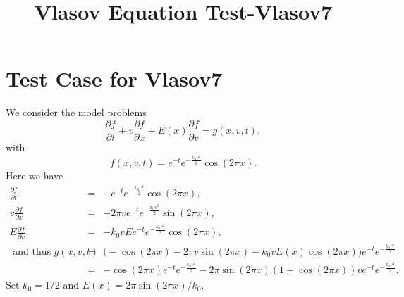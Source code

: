 \documentclass[a4paper,10pt]{article}
\title{Vlasov Equation Test-Vlasov7}
\author{}
\date{}
\numberwithin{equation}{section}
\begin{document}
\maketitle


\section{Test Case for Vlasov7}
We consider the model problems
\begin{equation}
\frac{\partial f}{\partial t}+v\frac{\partial f}{\partial x}+E(x)\frac{\partial f}{\partial v}=g(x,v,t),
\end{equation}
with 
$$f(x,v,t)=e^{-t}e^{-\frac{k_0v^2}{2}}\cos(2\pi x).$$
Here we have
\begin{eqnarray*}
\frac{\partial f}{\partial t}&=&-e^{-t}e^{-\frac{k_0v^2}{2}}\cos(2\pi x),\\
v\frac{\partial f}{\partial x}&=&-2\pi v e^{-t}e^{-\frac{k_0v^2}{2}}\sin(2\pi x),\\
E\frac{\partial f}{\partial v}&=& -k_0 v Ee^{-t}e^{-\frac{k_0v^2}{2}}\cos(2\pi x),\\
\mbox{ and thus } g(x,v,t)&=& \bigg(-\cos(2\pi x)-2\pi v \sin(2\pi x)-k_0 v E(x)\cos(2\pi x)\bigg)e^{-t}e^{-\frac{k_0v^2}{2}}\\
&=& -\cos(2\pi x)e^{-t}e^{-\frac{k_0v^2}{2}}-2\pi\sin(2\pi x)(1+\cos(2\pi x))ve^{-t}e^{-\frac{k_0v^2}{2}}.
\end{eqnarray*}
Set $k_0=1/2$ and $E(x)=2\pi\sin(2\pi x)/k_0.$
\end{document}

